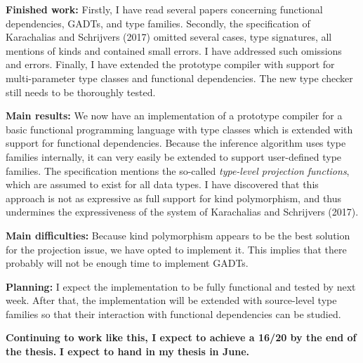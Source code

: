 \documentclass[12pt]{report}
\begin{document}
\vspace{.5cm}
{\bf Finished work:}
Firstly, I have read several papers concerning functional dependencies, GADTs,
and type families.
%
Secondly, the specification of Karachalias and Schrijvers (2017) omitted
several cases, type signatures, all mentions of kinds and contained small
errors. I have addressed such omissions and errors.
%
Finally, I have extended the prototype compiler with support for
multi-parameter type classes and functional dependencies. The new type checker
still needs to be thoroughly tested.

\vspace{.5cm}
{\bf Main results:}
We now have an implementation of a prototype compiler for a basic functional
programming language with type classes which is extended with support for
functional dependencies.
%
Because the inference algorithm uses type families internally, it can very
easily be extended to support user-defined type families.
%
The specification mentions the so-called {\em type-level projection functions},
which are assumed to exist for all data types. I have discovered that this
approach is not as expressive as full support for kind polymorphism, and thus
undermines the expressiveness of the system of Karachalias and Schrijvers
(2017).

\vspace{.5cm}
{\bf Main difficulties:}
Because kind polymorphism appears to be the best solution for the projection
issue, we have opted to implement it. This implies that there probably will not
be enough time to implement GADTs.

\vspace{.5cm}
{\bf Planning:}
I expect the implementation to be fully functional and tested by next week.
After that, the implementation will be extended with source-level type families
so that their interaction with functional dependencies can be studied.

\vspace{.5cm}
{\bf Continuing to work like this, I expect to achieve a 16/20 by the end of the
thesis.}
%
{\bf I expect to hand in my thesis in June.}
\end{document}
